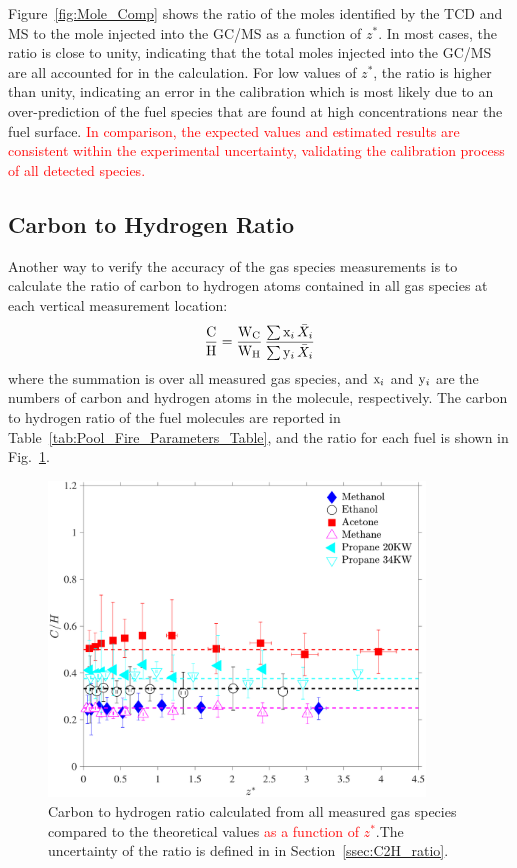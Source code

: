 \documentclass[12pt]{article}
\begin{document}
Figure~\ref{fig:Mole_Comp} shows the ratio of the moles identified by the TCD and MS to the mole injected into the GC/MS as a function of $z^*$. In most cases, the ratio is close to unity, indicating that the total moles injected into the GC/MS are all accounted for in the calculation. For low values of $z^*$, the ratio is higher than unity, indicating an error in the calibration which is most likely due to an over-prediction of the fuel species that are found at high concentrations near the fuel surface. \textcolor{red}{In comparison, the expected values and estimated results are consistent within the experimental uncertainty, validating the calibration process of all detected species.}

\subsection{Carbon to Hydrogen Ratio}

Another way to verify the accuracy of the gas species measurements is to calculate the ratio of carbon to hydrogen atoms contained in all gas species at each vertical measurement location:
\begin{equation}\label{eq:c2h_ratio}
  \frac{\rm C}{\rm H}= \frac{\textrm{W}_{\rm{C}}}{\textrm{W}_{\rm{H}}}\, \frac{ \sum  {\rm x}_i \, \bar{X}_{i}}{\sum {\rm y}_i \, \bar{X}_{i}}
\end{equation}
where the summation is over all measured gas species, and ${\rm x}_i$ and ${\rm y}_i$ are the numbers of carbon and hydrogen atoms in the molecule, respectively. The carbon to hydrogen ratio of the fuel molecules are reported in Table~\ref{tab:Pool_Fire_Parameters_Table}, and the ratio for each fuel is shown in Fig.~\ref{fig:C2H}.

\begin{figure}[h!]
	\centering
\includegraphics[width=10.0cm, keepaspectratio]{C2H_ratio_Comparison.pdf}
	\caption[Carbon to hydrogen ratio calculated from all species]{Carbon to hydrogen ratio calculated from all measured gas species compared to the theoretical values \textcolor{red}{ as a function of $z^*$}.The uncertainty of the ratio is defined in in Section~\ref{ssec:C2H_ratio}.}
	\label{fig:C2H}
\end{figure}
\end{document}
